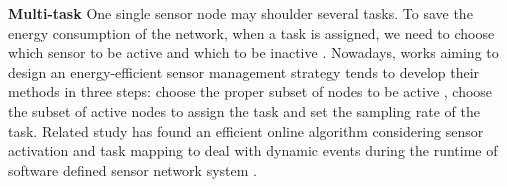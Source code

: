 \textbf{Multi-task}
One single sensor node may shoulder several tasks. To save the energy consumption of the network, 
when a task is assigned, we need to choose which sensor to be active and which to be inactive \cite{Georges2011Energy}. 
Nowadays, works aiming to design an energy-efficient sensor management strategy
tends to develop their methods in three steps: choose the proper subset of nodes to be active \cite{Aghdasi2009High}, choose the subset of active nodes to assign the task and set the sampling rate of the task. Related study has found an efficient online 
algorithm considering sensor activation and task mapping to deal with dynamic events during the 
runtime of software defined sensor network system \cite{Zeng2015}.

